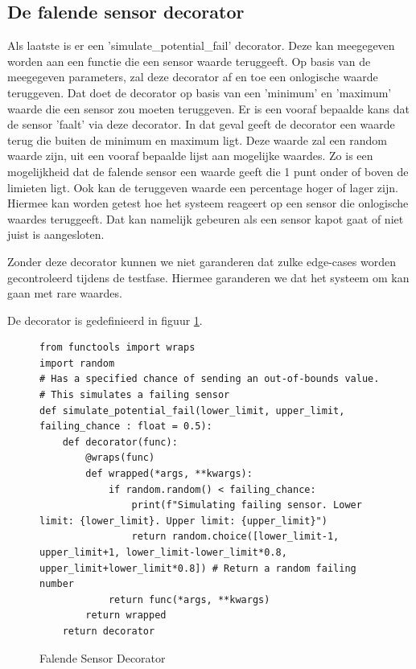 \documentclass[a4paper]{report}
\begin{document}
\subsection{De falende sensor decorator}
Als laatste is er een 'simulate\_potential\_fail' decorator.
Deze kan meegegeven worden aan een functie die een sensor waarde teruggeeft. 
Op basis van de meegegeven parameters, zal deze decorator af en toe een onlogische waarde teruggeven.
Dat doet de decorator op basis van een 'minimum' en 'maximum' waarde die een sensor zou moeten teruggeven.
Er is een vooraf bepaalde kans dat de sensor 'faalt' via deze decorator.
In dat geval geeft de decorator een waarde terug die buiten de minimum en maximum ligt.
Deze waarde zal een random waarde zijn, uit een vooraf bepaalde lijst aan mogelijke waardes. 
Zo is een mogelijkheid dat de falende sensor een waarde geeft die 1 punt onder of boven de limieten ligt.
Ook kan de teruggeven waarde een percentage hoger of lager zijn.
Hiermee kan worden getest hoe het systeem reageert op een sensor die onlogische waardes teruggeeft.
Dat kan namelijk gebeuren als een sensor kapot gaat of niet juist is aangesloten. 
\par\smallskip
Zonder deze decorator kunnen we niet garanderen dat zulke edge-cases worden gecontroleerd tijdens de testfase.
Hiermee garanderen we dat het systeem om kan gaan met rare waardes.
\par\smallskip
De decorator is gedefinieerd in figuur \ref{fig:decorator_simulate_fail}.
\begin{figure}[H]
\begin{verbatim}
from functools import wraps
import random
# Has a specified chance of sending an out-of-bounds value.
# This simulates a failing sensor
def simulate_potential_fail(lower_limit, upper_limit, failing_chance : float = 0.5):
    def decorator(func):
        @wraps(func)
        def wrapped(*args, **kwargs):
            if random.random() < failing_chance:
                print(f"Simulating failing sensor. Lower limit: {lower_limit}. Upper limit: {upper_limit}")
                return random.choice([lower_limit-1, upper_limit+1, lower_limit-lower_limit*0.8, upper_limit+lower_limit*0.8]) # Return a random failing number
            return func(*args, **kwargs)
        return wrapped
    return decorator
\end{verbatim}
\caption{Falende Sensor Decorator}
\label{fig:decorator_simulate_fail}
\end{figure}

\pagebreak
\end{document}
